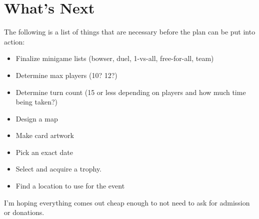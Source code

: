 \documentclass{article}
\begin{document}
\section{What's Next}

The following is a list of things that are necessary before the plan can be put into action:

\begin{itemize}
\item Finalize minigame lists (bowser, duel, 1-vs-all, free-for-all, team)
\item Determine max players (10? 12?)
\item Determine turn count (15 or less depending on players and how much time being taken?)
\item Design a map
\item Make card artwork
\item Pick an exact date
\item Select and acquire a trophy.
\item Find a location to use for the event
\end{itemize}


I'm hoping everything comes out cheap enough to not need to ask for admission or donations.
\end{document}

